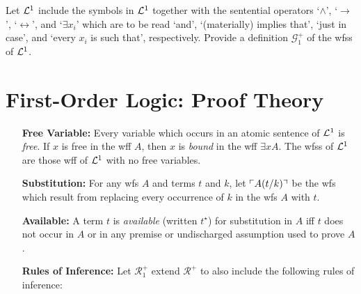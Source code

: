 \documentclass[a4paper, 11pt]{article} %
\begin{document}
Let $\mathcal{L}^1$ include the symbols in $\mathcal{L}^1$ together with the sentential operators `$\wedge$', `$\rightarrow$', `$\leftrightarrow$', and `$\exists x_i$' which are to be read `and', `(materially) implies that', `just in case', and `every $x_i$ is such that', respectively. Provide a definition $\mathcal{G}_1^+$ of the wfss of $\mathcal{L}^1$.




\section*{\sc First-Order Logic: Proof Theory}

\begin{enumerate}[leftmargin=1.2in,labelsep=.15in] %
\item[\bf Free Variable:] Every variable which occurs in an atomic sentence of $\mathcal{L}^1$ is \textit{free}. If $x$ is free in the wff $A$, then $x$ is \textit{bound} in the wff $\exists xA$. The wfss of $\mathcal{L}^1$ are those wff of $\mathcal{L}^1$ with no free variables.
\item[\bf Substitution:] For any wfs ${A}$ and terms $t$ and $k$, let $\ulcorner A(t/k)\urcorner$ be the wfs which result from replacing every occurrence of $k$ in the wfs ${A}$ with $t$.
\item[\bf Available:] A term $t$ is \textit{available} (written $t^\star$) for substitution in ${A}$ iff $t$ does not occur in ${A}$ or in any premise or undischarged assumption used to prove $A$.
\item[\bf Rules of Inference:] Let $\mathcal{R}_1^+$ extend $\mathcal{R}^+$ to also include the following rules of inference:%
\end{enumerate}
\end{document}
